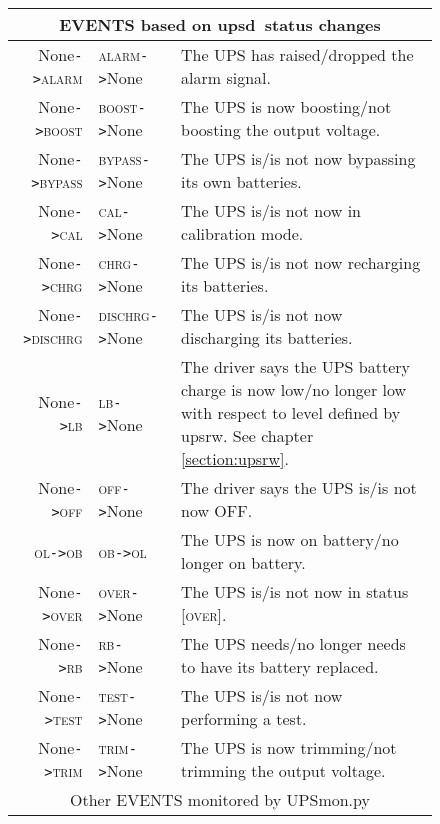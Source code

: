 \documentclass[12pt]{article}
\newcommand{\upsd}{\mbox{\textcolor{UPSDCOLOUR}{upsd}}}
\newcommand{\upsrw}{\mbox{\textcolor{UPSMONCOLOUR}{upsrw}}}
\newcommand{\UPSmon}{\mbox{\textcolor{UPSMONCOLOUR}{UPSmon.py}}}
\newcommand{\ALARM}{\textcolor{UPSDCOLOUR}{\textsc{alarm}}}
\newcommand{\BOOST}{\textcolor{UPSDCOLOUR}{\textsc{boost}}}
\newcommand{\BYPASS}{\textcolor{UPSDCOLOUR}{\textsc{bypass}}}
\newcommand{\CAL}{\textcolor{UPSDCOLOUR}{\textsc{cal}}}
\newcommand{\CHRG}{\textcolor{UPSDCOLOUR}{\textsc{chrg}}}
\newcommand{\DISCHRG}{\textcolor{UPSDCOLOUR}{\textsc{dischrg}}}
\newcommand{\LB}{\textcolor{UPSDCOLOUR}{\textsc{lb}}}
\newcommand{\OB}{\textcolor{UPSDCOLOUR}{\textsc{ob}}}
\newcommand{\OFF}{\textcolor{UPSDCOLOUR}{\textsc{off}}}
\newcommand{\OL}{\textcolor{UPSDCOLOUR}{\textsc{ol}}}
\newcommand{\OVER}{\textcolor{UPSDCOLOUR}{\textsc{over}}}
\newcommand{\RB}{\textcolor{UPSDCOLOUR}{\textsc{rb}}}
\newcommand{\TEST}{\textcolor{UPSDCOLOUR}{\textsc{test}}}
\newcommand{\TRIM}{\textcolor{UPSDCOLOUR}{\textsc{trim}}}
\newcommand{\None}{\textcolor{UPSMONCOLOUR}{\textsf{None}}}
\newcommand{\status}[1]{\textcolor{UPSDCOLOUR}{[{#1}]}}
\newcommand{\EVENT}[2]{\textcolor{MONCOLOUR}{#1}{\allowbreak}\texttt{\textcolor{MONCOLOUR}{->}}{\allowbreak}\textcolor{MONCOLOUR}{#2}}
\begin{document}
\begin{figure}[ht]
\begin{center}
\begin{tabular}{|r|l|p{0.65\LinePrinterwidth}|}
\hline
\multicolumn{3}{|c|}{EVENTS based on \upsd\ status changes} \\ \hline
\EVENT{\None}{\ALARM}   & \EVENT{\ALARM}{\None}    & The UPS has raised/dropped the alarm signal. \\ \hline
\EVENT{\None}{\BOOST}   & \EVENT{\BOOST}{\None}    & The UPS is now boosting/not boosting the output voltage. \\ \hline
\EVENT{\None}{\BYPASS}  & \EVENT{\BYPASS}{\None}   & The UPS is/is not now bypassing its own batteries. \\ \hline
\EVENT{\None}{\CAL}     & \EVENT{\CAL}{\None}      & The UPS is/is not now in calibration mode. \\ \hline
\EVENT{\None}{\CHRG}    & \EVENT{\CHRG}{\None}     & The UPS is/is not now recharging its batteries. \\ \hline
\EVENT{\None}{\DISCHRG} & \EVENT{\DISCHRG}{\None}  & The UPS is/is not now discharging its batteries. \\ \hline
\EVENT{\None}{\LB}      & \EVENT{\LB}{\None}       & The driver says the UPS battery charge is now low/no longer low
                                                     with respect to level defined by \upsrw.
                                                     See chapter \ref{section:upsrw}. \\ \hline
\EVENT{\None}{\OFF}     & \EVENT{\OFF}{\None}      & The driver says the UPS is/is not now OFF. \\ \hline
\EVENT{\OL}{\OB}        & \EVENT{\OB}{\OL}         & The UPS is now on battery/no longer on battery. \\ \hline
\EVENT{\None}{\OVER}    & \EVENT{\OVER}{\None}     & The UPS is/is not now in status \status{\OVER}. \\ \hline
\EVENT{\None}{\RB}      & \EVENT{\RB}{\None}       & The UPS needs/no longer needs to have its battery replaced. \\ \hline
\EVENT{\None}{\TEST}    & \EVENT{\TEST}{\None}     & The UPS is/is not now performing a test. \\ \hline
\EVENT{\None}{\TRIM}    & \EVENT{\TRIM}{\None}     & The UPS is now trimming/not trimming the output voltage. \\ \hline\hline
\multicolumn{3}{|c|}{Other EVENTS monitored by \UPSmon} \\ \hline

\end{tabular}
\end{center}
\end{figure}
\end{document}
